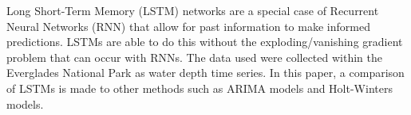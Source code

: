 \begin{doublespace}
Long Short-Term Memory (LSTM) networks are a special case of Recurrent Neural Networks (RNN) that allow for past information to make informed predictions. LSTMs are able to do this without the exploding/vanishing gradient problem that can occur with RNNs. The data used were collected within the Everglades National Park as water depth time series. In this paper, a comparison of LSTMs is made to other methods such as ARIMA models and Holt-Winters models. 
\end{doublespace}